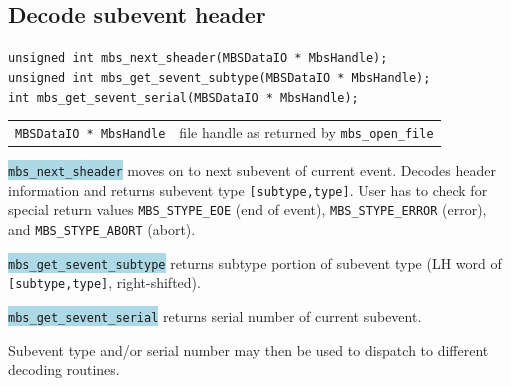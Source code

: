 \documentclass[10pt]{article}
\newcommand{\blue}[1]{\colorbox{lightblue}{\texttt{#1}}}
\newenvironment{blueboxed}
	{\begin{Sbox}\begin{minipage}[t]}
	{\end{minipage}\end{Sbox}\colorbox{lightblue}{\TheSbox}}
\begin{document}
\subsection{Decode subevent header}\vspace{3mm}
\begin{center}
\begin{blueboxed}{.8\linewidth}
	\verb+unsigned int mbs_next_sheader(MBSDataIO * MbsHandle);+\\
	\verb+unsigned int mbs_get_sevent_subtype(MBSDataIO * MbsHandle);+\\
	\verb+int mbs_get_sevent_serial(MBSDataIO * MbsHandle);+
\end{blueboxed}
\end{center}
\begin{center}
\begin{tabular}{ll}
\verb+MBSDataIO * MbsHandle+	& file handle as returned by \verb+mbs_open_file+\\
\end{tabular}
\end{center}
\blue{mbs\_next\_sheader} moves on to next subevent of current event.
Decodes header information and returns subevent type \verb+[subtype,type]+.
User has to check for special return values \verb+MBS_STYPE_EOE+ (end of event),
\verb+MBS_STYPE_ERROR+ (error), and \verb+MBS_STYPE_ABORT+ (abort).

\blue{mbs\_get\_sevent\_subtype} returns subtype portion of subevent type (LH word of \verb+[subtype,type]+, right-shifted).

\blue{mbs\_get\_sevent\_serial} returns serial number of current subevent.

Subevent type and/or serial number may then be used to dispatch to different decoding routines.
\vspace{5mm}
\end{document}
